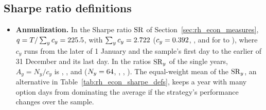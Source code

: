 \subsection{Sharpe ratio definitions}
\label{app:rh_econ_sharpe}

\begin{itemize}
\item \textbf{Annualization.} In the Sharpe ratio $\mathrm{SR}$ of Section~\ref{sec:rh_econ_measures},
  $q = T/\sum_y c_y = 225.5$, with $\sum_y c_y = 2.722$ ($c_y = 0.392$, \rheDSixCovTwo,
  \rheDSixCovThree{} and \rheDSixCovFour{} for \rheDSixYearOne{} to \rheDSixYearFour), where $c_y$ runs from the later
  of 1 January and the sample's first day to the earlier of 31 December and its last day. In the ratios $\mathrm{SR}_y$ of
  the single years, $A_y = N_y/c_y$ is \rheDSixAOne, \rheDSixATwo, \rheDSixAThree{} and \rheDSixAFour{}
  ($N_y = 64$, \rheDSixNTwo, \rheDSixNThree, \rheDSixNFour). The equal-weight mean of the $\mathrm{SR}_y$, an
  alternative in Table~\ref{tab:rh_econ_sharpe_defs}, keeps a year with many option days from dominating the average
  if the strategy's performance changes over the sample.

\end{itemize}

